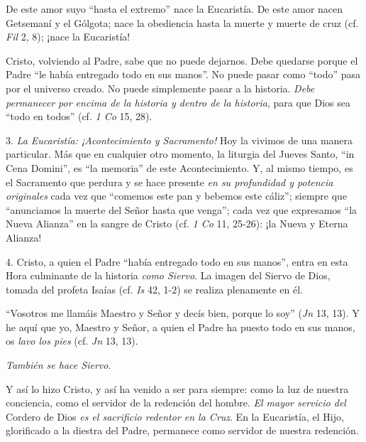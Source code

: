 			\begin{body}De este amor suyo “hasta el extremo” nace la Eucaristía. De este amor nacen Getsemaní y el Gólgota; nace la obediencia hasta la muerte y muerte de cruz (cf. \textit{Fil} 2, 8); ¡nace la Eucaristía! \end{body}
			
			\begin{body}Cristo, volviendo al Padre, sabe que no puede dejarnos. Debe quedarse porque el Padre “le había entregado todo en sus manos”. No puede pasar como “todo” pasa por el universo creado. No puede simplemente pasar a la historia. \textit{Debe permanecer por encima de la historia y dentro de la historia}, para que Dios sea “todo en todos” (cf. \textit{1 Co} 15, 28). \end{body}
			
			\begin{body}3. \textit{La Eucaristía: ¡Acontecimiento y Sacramento! }Hoy la vivimos de una manera particular. Más que en cualquier otro momento, la liturgia del Jueves Santo, “in Cena Domini”, es “la memoria” de este Acontecimiento. Y, al mismo tiempo, es el Sacramento que perdura y se hace presente \textit{en su profundidad y potencia originales} cada vez que “comemos este pan y bebemos este cáliz”; siempre que “anunciamos la muerte del Señor hasta que venga”; cada vez que expresamos “la Nueva Alianza” en la sangre de Cristo (cf. \textit{1 Co} 11, 25-26): ¡la Nueva y Eterna Alianza! \end{body}
			
			\begin{body}4. Cristo, a quien el Padre “había entregado todo en sus manos”, entra en esta Hora culminante de la historia \textit{como Siervo}. La imagen del Siervo de Dios, tomada del profeta Isaías (cf. \textit{Is} 42, 1-2) se realiza plenamente en él. \end{body}
			
			\begin{body}“Vosotros me llamáis Maestro y Señor y decís bien, porque lo soy” (\textit{Jn }13, 13). Y he aquí que yo, Maestro y Señor, a quien el Padre ha puesto todo en sus manos, os \textit{lavo los pies }(cf. \textit{Jn} 13, 13). \end{body}
			
			\begin{body}\textit{También se hace Siervo}. \end{body}
			
			\begin{body}Y así lo hizo Cristo, y así ha venido a ser para siempre: como la luz de nuestra conciencia, como el servidor de la redención del hombre. \textit{El mayor servicio del} Cordero de Dios \textit{es el sacrificio redentor en la Cruz}. En la Eucaristía, el Hijo, glorificado a la diestra del Padre, permanece como servidor de nuestra redención. \end{body}
			
